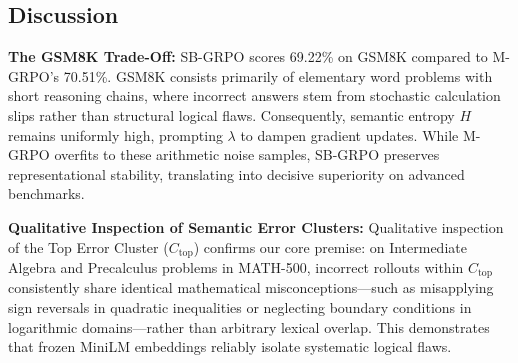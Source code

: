 \subsection{Discussion}\label{subsec:discussion}
\textbf{The GSM8K Trade-Off:} SB-GRPO scores 69.22\% on GSM8K compared to M-GRPO's 70.51\%. GSM8K consists primarily of elementary word problems with short reasoning chains, where incorrect answers stem from stochastic calculation slips rather than structural logical flaws. Consequently, semantic entropy $H$ remains uniformly high, prompting $\lambda$ to dampen gradient updates. While M-GRPO overfits to these arithmetic noise samples, SB-GRPO preserves representational stability, translating into decisive superiority on advanced benchmarks.

\textbf{Qualitative Inspection of Semantic Error Clusters:} Qualitative inspection of the Top Error Cluster ($C_{\text{top}}$) confirms our core premise: on Intermediate Algebra and Precalculus problems in MATH-500, incorrect rollouts within $C_{\text{top}}$ consistently share identical mathematical misconceptions---such as misapplying sign reversals in quadratic inequalities or neglecting boundary conditions in logarithmic domains---rather than arbitrary lexical overlap. This demonstrates that frozen MiniLM embeddings reliably isolate systematic logical flaws.
